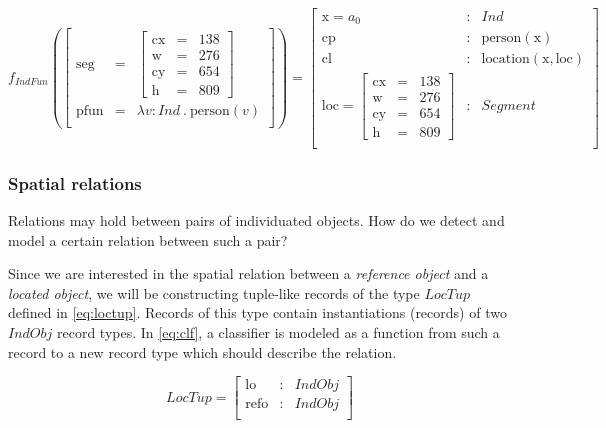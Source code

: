 \begin{equation}\label{eq:indfunrec}
f_{IndFun}(
\left[\begin{array}{rcl}
\text{seg} &=& \left[\begin{array}{rcl}
\text{cx} &=& 138\\
\text{w} &=& 276\\
\text{cy} &=& 654\\
\text{h} &=& 809
\end{array}\right]\\
\text{pfun} &=& \lambda v:Ind\ .\ \text{person}(v)\\
\end{array}\right]
) =
\left[\begin{array}{lcl}
    \text{x} = a_0 &:& Ind \\
    \text{cp} &:& \text{person}(\text{x}) \\
    \text{cl} &:& \text{location}(\text{x}, \text{loc}) \\
    \text{loc} = \left[\begin{array}{rcl}
		\text{cx} &=& 138\\
		\text{w} &=& 276\\
		\text{cy} &=& 654\\
		\text{h} &=& 809
		\end{array}\right] &:& Segment\\
\end{array}\right]
\end{equation}



\subsubsection{Spatial relations}

Relations may hold between pairs of individuated objects.
How do we detect and model a certain relation between such a pair?

Since we are interested in the spatial relation between a \textit{reference object} and a \textit{located object}, we will be constructing tuple-like records of the type $LocTup$ defined in \autoref{eq:loctup}.
Records of this type contain instantiations (records) of two $IndObj$ record types.
In \autoref{eq:clf}, a classifier is modeled as a function from such a record to a new record type which should describe the relation.

\begin{equation}\label{eq:loctup}
LocTup = \left[\begin{array}{rcl}
    \text{lo} &:& IndObj \\
    \text{refo} &:& IndObj \\
    \end{array}\right]
\end{equation}

